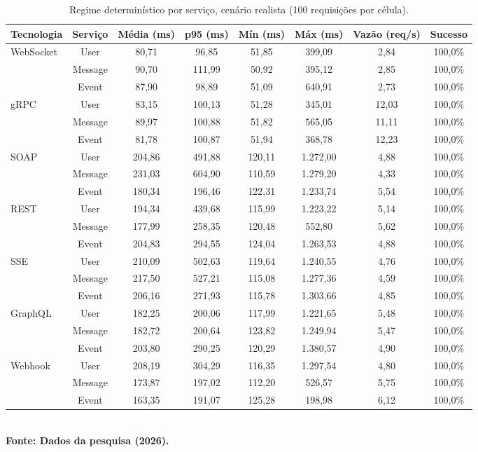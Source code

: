 \begin{table}[H]
\centering
\scriptsize
\caption{Regime determinístico por serviço, cenário realista (100 requisições por célula).}
\label{tab:det_srv_realista}
\begin{tabular}{|l|c|c|c|c|c|c|c|}
\hline
\textbf{Tecnologia} & \textbf{Serviço} & \textbf{Média (ms)} & \textbf{p95 (ms)} & \textbf{Mín (ms)} & \textbf{Máx (ms)} & \textbf{Vazão (req/s)} & \textbf{Sucesso} \\ \hline
WebSocket & User & 80,71 & 96,85 & 51,85 & 399,09 & 2,84 & 100,0\% \\ \hline
 & Message & 90,70 & 111,99 & 50,92 & 395,12 & 2,85 & 100,0\% \\ \hline
 & Event & 87,90 & 98,89 & 51,09 & 640,91 & 2,73 & 100,0\% \\ \hline
gRPC & User & 83,15 & 100,13 & 51,28 & 345,01 & 12,03 & 100,0\% \\ \hline
 & Message & 89,97 & 100,88 & 51,82 & 565,05 & 11,11 & 100,0\% \\ \hline
 & Event & 81,78 & 100,87 & 51,94 & 368,78 & 12,23 & 100,0\% \\ \hline
SOAP & User & 204,86 & 491,88 & 120,11 & 1.272,00 & 4,88 & 100,0\% \\ \hline
 & Message & 231,03 & 604,90 & 110,59 & 1.279,20 & 4,33 & 100,0\% \\ \hline
 & Event & 180,34 & 196,46 & 122,31 & 1.233,74 & 5,54 & 100,0\% \\ \hline
REST & User & 194,34 & 439,68 & 115,99 & 1.223,22 & 5,14 & 100,0\% \\ \hline
 & Message & 177,99 & 258,35 & 120,48 & 552,80 & 5,62 & 100,0\% \\ \hline
 & Event & 204,83 & 294,55 & 124,04 & 1.263,53 & 4,88 & 100,0\% \\ \hline
SSE & User & 210,09 & 502,63 & 119,64 & 1.240,55 & 4,76 & 100,0\% \\ \hline
 & Message & 217,50 & 527,21 & 115,08 & 1.277,36 & 4,59 & 100,0\% \\ \hline
 & Event & 206,16 & 271,93 & 115,78 & 1.303,66 & 4,85 & 100,0\% \\ \hline
GraphQL & User & 182,25 & 200,06 & 117,99 & 1.221,65 & 5,48 & 100,0\% \\ \hline
 & Message & 182,72 & 200,64 & 123,82 & 1.249,94 & 5,47 & 100,0\% \\ \hline
 & Event & 203,80 & 290,25 & 120,29 & 1.380,57 & 4,90 & 100,0\% \\ \hline
Webhook & User & 208,19 & 304,29 & 116,35 & 1.297,54 & 4,80 & 100,0\% \\ \hline
 & Message & 173,87 & 197,02 & 112,20 & 526,57 & 5,75 & 100,0\% \\ \hline
 & Event & 163,35 & 191,07 & 125,28 & 198,98 & 6,12 & 100,0\% \\ \hline
\end{tabular}
{\footnotesize\\ \textbf{Fonte: Dados da pesquisa (2026).}}
\end{table}
